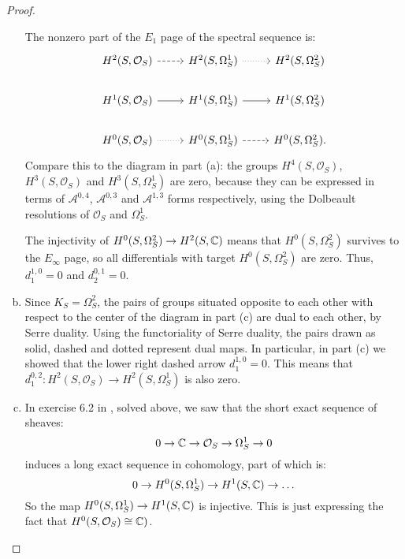 \documentclass{article}
\begin{document}
\begin{proof}
\begin{enumerate}[(a)]
The nonzero part of the $E_1$ page of the spectral sequence is:
\[
\begin{tikzcd}
H^2(S,\mathcal{O}_S)\arrow[dashed]{r} & H^2(S,\Omega^1_S)\arrow[dotted]{r} & H^2(S,\Omega^2_S) \\
H^1(S,\mathcal{O}_S)\arrow{r} & H^1(S,\Omega^1_S)\arrow{r} & H^1(S,\Omega^2_S) \\
H^0(S,\mathcal{O}_S)\arrow[dotted]{r} & H^0(S,\Omega^1_S)\arrow[dashed]{r} & H^0(S,\Omega^2_S).
\end{tikzcd}
\]
Compare this to the diagram in part (a): the groups $H^4(S,\mathcal{O}_S)$, $H^3(S,\mathcal{O}_S)$ and
$H^3(S,\Omega^1_S)$ are zero, because they can be expressed in terms of $\mathcal{A}^{0,4}$, $\mathcal{A}^{0,3}$
and $\mathcal{A}^{1,3}$ forms respectively, using the Dolbeault resolutions of $\mathcal{O}_S$ and $\Omega^1_S$.

The injectivity of $H^0(S,\Omega^2_S) \to H^2(S,\mathbb{C})$ means that $H^0(S,\Omega^2_S)$ survives to the $E_{\infty}$
page, so all differentials with target $H^0(S,\Omega^2_S)$ are zero. Thus, $d_1^{1,0} = 0$ and $d_2^{0,1} = 0$.

\item Since $K_S = \Omega_S^2$, the pairs of groups situated opposite to each other with respect to the center of
the diagram in part (c) are dual to each other, by Serre duality. Using the functoriality of Serre duality,
the pairs drawn as solid, dashed and dotted represent dual maps. In particular, in part (c) we showed that
the lower right dashed arrow $d_1^{1,0} = 0$. This means that $d_1^{0,2} : H^2(S,\mathcal{O}_S) \to
H^2(S,\Omega^1_S)$ is also zero.

\item In exercise 6.2 in \cite{Voi1}, solved above, we saw that the short exact sequence of sheaves:
\[	0 \to \mathbb{C} \to \mathcal{O}_S \to \Omega^1_S \to 0	\]
induces a long exact sequence in cohomology, part of which is:
\[	0 \to H^0(S,\Omega^1_S) \to H^1(S,\mathbb{C}) \to \dots	\]
So the map $H^0(S,\Omega^1_S) \to H^1(S,\mathbb{C})$ is injective. This is just expressing the fact that $H^0(S,\mathcal{O}_S)
\cong \mathbb{C})$.


\end{enumerate}
\end{proof}
\end{document}
